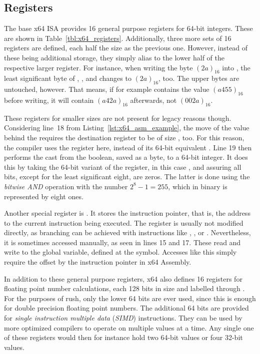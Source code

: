 \subsection{Registers}

The base x64 ISA provides 16 general purpose registers for 64-bit integers.
These are shown in Table~\ref{tbl:x64_registers}.
Additionally, three more sets of 16 registers are defined, each half the size as the previous one.
However, instead of these being additional storage, they simply alias to the lower half of the respective larger register.
For instance, when writing the byte $(2a)_{16}$ into , the least significant byte of , , and  changes to $(2a)_{16}$, too.
The upper bytes are untouched, however.
That means, if for example  contains the value $(a455)_{16}$ before writing, it will contain $(a42a)_{16}$ afterwards, not $(002a)_{16}$.

These registers for smaller sizes are not present for legacy reasons though.
Considering line~18 from Listing~\ref{lst:x64_asm_example}, the move of the value behind the  requires the destination register to be of size , too.
For this reason, the compiler uses the  register here, instead of its 64-bit equivalent .
Line 19 then performs the cast from the boolean, saved as a byte, to a 64-bit integer.
It does this by taking the 64-bit variant of the register, in this case , and assuring all bits, except for the least significant eight, are zeros.
The latter is done using the \emph{bitwise AND} operation with the number $2^8-1=255$, which in binary is represented by eight ones.

Another special register is .
It stores the instruction pointer, that is, the address to the current instruction being executed.
The register is usually not modified directly, as branching can be achieved with instructions like , , or .
Nevertheless, it is sometimes accessed manually, as seen in lines 15 and 17.
These read and write to the global  variable, defined at the  symbol.
Accesses like this simply require the offset by the instruction pointer in x64 Assembly.

In addition to these general purpose registers, x64 also defines 16 registers for floating point number calculations, each 128 bits in size and labelled  through .
For the purposes of rush, only the lower 64 bits are ever used, since this is enough for double precision floating point numbers.
The additional 64 bits are provided for \emph{single instruction multiple data} (\emph{SIMD}) instructions.
They can be used by more optimized compilers to operate on multiple values at a time.
Any single one of these registers would then for instance hold two 64-bit values or four 32-bit values.

